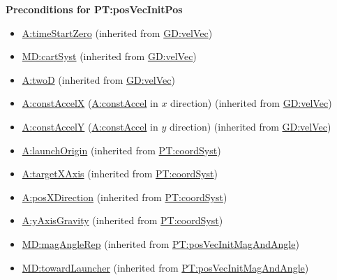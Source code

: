\documentclass[12pt]{article}
\begin{document}
\noindent \textbf{Preconditions for PT:posVecInitPos} 
\begin{itemize} 
\item \hyperref[timeStartZero]{A:timeStartZero} (inherited from
\hyperref[GD:velVec]{GD:velVec}) \item \hyperref[MD:cartSyst]{MD:cartSyst}
(inherited from \hyperref[GD:velVec]{GD:velVec}) \item \hyperref[twoD]{A:twoD}
(inherited from \hyperref[GD:velVec]{GD:velVec}) \item
\hyperref[constAccelX]{A:constAccelX} (\hyperref[constAccel]{A:constAccel} in
$x$ direction) (inherited from \hyperref[GD:velVec]{GD:velVec}) \item
\hyperref[constAccelY]{A:constAccelY} (\hyperref[constAccel]{A:constAccel} in
$y$ direction) (inherited from \hyperref[GD:velVec]{GD:velVec}) \item
\hyperref[launchOrigin]{A:launchOrigin} (inherited from
\hyperref[PT:coordSyst]{PT:coordSyst}) \item
\hyperref[targetXAxis]{A:targetXAxis} (inherited from
\hyperref[PT:coordSyst]{PT:coordSyst}) 
\item \hyperref[posXDirection]{A:posXDirection} (inherited from
\hyperref[PT:coordSyst]{PT:coordSyst}) 
\item \hyperref[yAxisGravity]{A:yAxisGravity} (inherited from
\hyperref[PT:coordSyst]{PT:coordSyst}) 
\item \hyperref[MD:magAngleRep]{MD:magAngleRep} (inherited from \hyperref[PT:posVecInitMagAndAngle]{PT:posVecInitMagAndAngle})
\item \hyperref[MD:towardLauncher]{MD:towardLauncher} (inherited from \hyperref[PT:posVecInitMagAndAngle]{PT:posVecInitMagAndAngle})
\end{itemize} 
\end{document}
